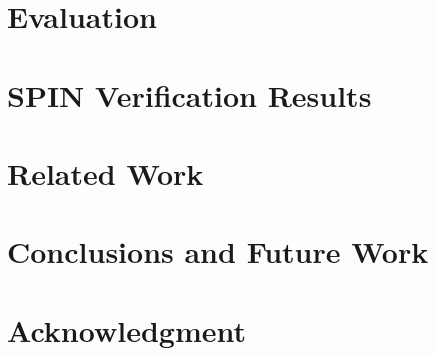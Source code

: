 \documentclass[conference]{IEEEtran}
\begin{document}
\section{Evaluation}
\label{sec:eval}


\section{SPIN Verification Results}
\label{sec:results}


\section{Related Work}


\section{Conclusions and Future Work}


\section*{Acknowledgment}


{\small 
}
\end{document}
